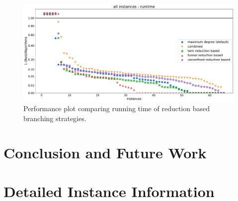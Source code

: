\documentclass[a4paper,UKenglish,cleveref, autoref, thm-restate]{lipics-v2021}
\begin{document}
\begin{figure}
  \includegraphics[width=\textwidth]{plots/all_reduction_based_time}
  \caption{Performance plot comparing running time of reduction based branching strategies.}
  \label{fig:all_reduction_time}
\end{figure}
\section{Conclusion and Future Work}


\FloatBarrier


\newpage

\appendix

\section{Detailed Instance Information}
\label{app:instances}

\newpage
\end{document}
